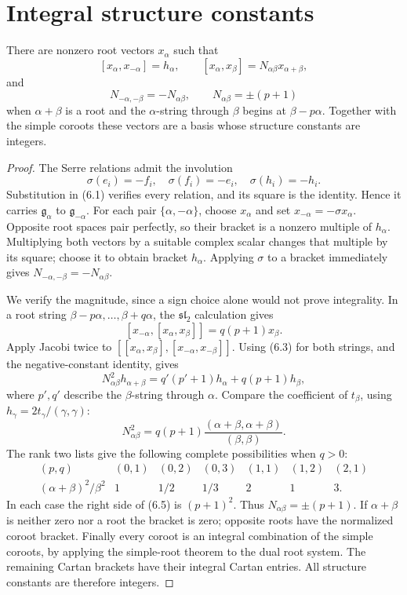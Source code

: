 \section{Integral structure constants}

\begin{theorem}\label{res:F05}
There are nonzero root vectors \(x_\alpha\) such that
\[
 [x_\alpha,x_{-\alpha}]=h_\alpha,\qquad
 [x_\alpha,x_\beta]=N_{\alpha\beta}x_{\alpha+\beta},
\]
and
\[
 N_{-\alpha,-\beta}=-N_{\alpha\beta},\qquad
 N_{\alpha\beta}=\pm(p+1)
\]
when \(\alpha+\beta\) is a root and the \(\alpha\)-string
through \(\beta\) begins at \(\beta-p\alpha\).
Together with the simple coroots these vectors are a basis
whose structure constants are integers.
\end{theorem}
\begin{proof}
The Serre relations admit the involution
\[
 \sigma(e_i)=-f_i,\quad \sigma(f_i)=-e_i,\quad
 \sigma(h_i)=-h_i.
\]
Substitution in (6.1) verifies every relation, and its square
is the identity. Hence it carries
\(\mathfrak g_\alpha\) to \(\mathfrak g_{-\alpha}\).
For each pair \(\{\alpha,-\alpha\}\), choose \(x_\alpha\)
and set \(x_{-\alpha}=-\sigma x_\alpha\).
Opposite root spaces pair perfectly, so their bracket is
a nonzero multiple of \(h_\alpha\). Multiplying both vectors
by a suitable complex scalar changes that multiple by its
square; choose it to obtain bracket \(h_\alpha\).
Applying \(\sigma\) to a bracket immediately gives
\(N_{-\alpha,-\beta}=-N_{\alpha\beta}\).

We verify the magnitude, since a sign choice alone would
not prove integrality. In a root string
\(\beta-p\alpha,\ldots,\beta+q\alpha\),
the \(\mathfrak{sl}_2\) calculation gives
\[
 [x_{-\alpha},[x_\alpha,x_\beta]]
       =q(p+1)x_\beta .
 \tag{6.3}
\]
Apply Jacobi twice to
\([[x_\alpha,x_\beta],[x_{-\alpha},x_{-\beta}]]\).
Using (6.3) for both strings, and the negative-constant
identity, gives
\[
 N_{\alpha\beta}^2h_{\alpha+\beta}
       =q'(p'+1)h_\alpha+q(p+1)h_\beta,
 \tag{6.4}
\]
where \(p',q'\) describe the \(\beta\)-string through
\(\alpha\). Compare the coefficient of \(t_\beta\),
using \(h_\gamma=2t_\gamma/(\gamma,\gamma)\):
\[
 N_{\alpha\beta}^2
   =q(p+1)\frac{(\alpha+\beta,\alpha+\beta)}{(\beta,\beta)}.
 \tag{6.5}
\]
The rank two lists give the following complete possibilities
when \(q>0\):
\[
\begin{array}{c|rrrrrr}
(p,q)&(0,1)&(0,2)&(0,3)&(1,1)&(1,2)&(2,1)\\
(\alpha+\beta)^2/\beta^2&1&1/2&1/3&2&1&3 .
\end{array}
\]
In each case the right side of (6.5) is \((p+1)^2\).
Thus \(N_{\alpha\beta}=\pm(p+1)\).
If \(\alpha+\beta\) is neither zero nor a root the bracket
is zero; opposite roots have the normalized coroot bracket.
Finally every coroot is an integral combination of the simple
coroots, by applying the simple-root theorem to the dual root
system. The remaining Cartan brackets have their integral
Cartan entries. All structure constants are therefore integers.


\end{proof}
